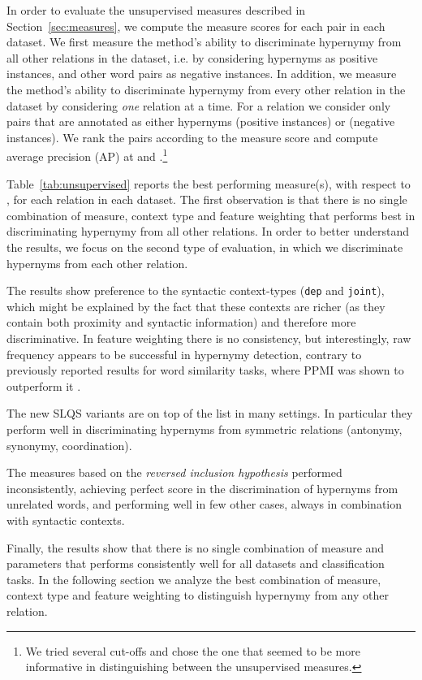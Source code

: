 \documentclass[11pt]{article}
\newcommand\smalltt[1]{\texttt{\small #1}}
\begin{document}
In order to evaluate the unsupervised measures described in Section~\ref{sec:measures}, we compute the measure scores for each  pair in each dataset. 
We first measure the method's ability to discriminate hypernymy from all other relations in the dataset, i.e. by considering hypernyms as positive instances, and other word pairs as negative instances. In addition, we measure the method's ability to discriminate hypernymy from every other relation in the dataset by considering \emph{one} relation at a time. For a relation  we consider only  pairs that are annotated as either hypernyms (positive instances) or  (negative instances). We rank the pairs according to the measure score and compute average precision (AP) at  and .\footnote{We tried several cut-offs and chose the one that seemed to be more informative in distinguishing between the unsupervised measures.}

Table~\ref{tab:unsupervised} reports the best performing measure(s), with respect to , for each relation in each dataset. The first observation is that there is no single combination of measure, context type and feature weighting that performs best in discriminating hypernymy from all other relations. In order to better understand the results, we focus on the second type of evaluation, in which we discriminate hypernyms from each other relation. 

The results show preference to the syntactic context-types (\smalltt{dep} and \smalltt{joint}), which might be explained by the fact that these contexts are richer (as they contain both proximity and syntactic information) and therefore more discriminative. In feature weighting there is no consistency, but interestingly, raw frequency appears to be successful in hypernymy detection, contrary to previously reported results for word similarity tasks, where PPMI was shown to outperform it \cite{bullinaria2007extracting,levy2015improving}. 

The new SLQS variants are on top of the list in many settings. In particular they perform well in discriminating hypernyms from symmetric relations (antonymy, synonymy, coordination). 

The measures based on the \emph{reversed inclusion hypothesis} performed inconsistently, achieving perfect score in the discrimination of hypernyms from unrelated words, and performing well in few other cases, always in combination with syntactic contexts.

Finally, the results show that there is no single combination of measure and parameters that performs consistently well for all datasets and classification tasks. In the following section we analyze the best combination of measure, context type and feature weighting to distinguish hypernymy from any other relation. 
\end{document}
